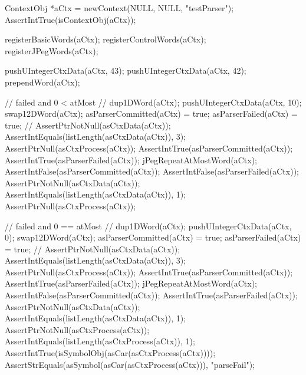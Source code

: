 \startCTest
  ContextObj *aCtx = newContext(NULL, NULL, "testParser");
  AssertIntTrue(isContextObj(aCtx));
  
  registerBasicWords(aCtx);
  registerControlWords(aCtx);
  registerJPegWords(aCtx);
  
  pushUIntegerCtxData(aCtx, 43);
  pushUIntegerCtxData(aCtx, 42);
  prependWord(aCtx);

  // failed and 0 < atMost
  //
  dup1DWord(aCtx);
  pushUIntegerCtxData(aCtx, 10);
  swap12DWord(aCtx);
  asParserCommitted(aCtx) = true;
  asParserFailed(aCtx) = true;
  //
  AssertPtrNotNull(asCtxData(aCtx));
  AssertIntEquals(listLength(asCtxData(aCtx)), 3);
  AssertPtrNull(asCtxProcess(aCtx));
  AssertIntTrue(asParserCommitted(aCtx));
  AssertIntTrue(asParserFailed(aCtx));
  jPegRepeatAtMostWord(aCtx);
  AssertIntFalse(asParserCommitted(aCtx));
  AssertIntFalse(asParserFailed(aCtx));
  AssertPtrNotNull(asCtxData(aCtx));
  AssertIntEquals(listLength(asCtxData(aCtx)), 1);
  AssertPtrNull(asCtxProcess(aCtx));

  // failed and 0 == atMost
  //
  dup1DWord(aCtx);
  pushUIntegerCtxData(aCtx, 0);
  swap12DWord(aCtx);
  asParserCommitted(aCtx) = true;
  asParserFailed(aCtx) = true;
  //
  AssertPtrNotNull(asCtxData(aCtx));
  AssertIntEquals(listLength(asCtxData(aCtx)), 3);
  AssertPtrNull(asCtxProcess(aCtx));
  AssertIntTrue(asParserCommitted(aCtx));
  AssertIntTrue(asParserFailed(aCtx));
  jPegRepeatAtMostWord(aCtx);
  AssertIntFalse(asParserCommitted(aCtx));
  AssertIntTrue(asParserFailed(aCtx));
  AssertPtrNotNull(asCtxData(aCtx));
  AssertIntEquals(listLength(asCtxData(aCtx)), 1);
  AssertPtrNotNull(asCtxProcess(aCtx));
  AssertIntEquals(listLength(asCtxProcess(aCtx)), 1);
  AssertIntTrue(isSymbolObj(asCar(asCtxProcess(aCtx))));
  AssertStrEquals(asSymbol(asCar(asCtxProcess(aCtx))), "parseFail");

